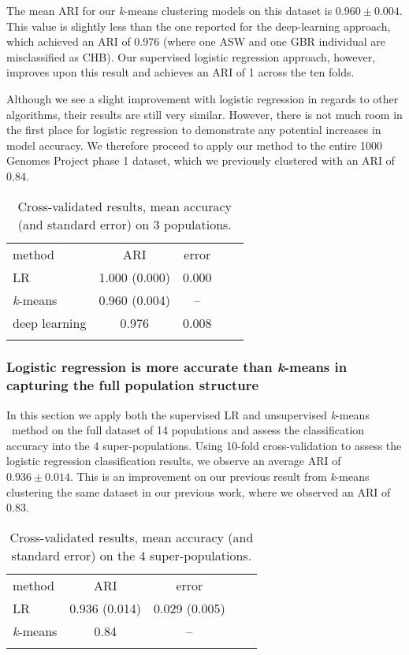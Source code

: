 \documentclass{llncs}
\newcommand{\kMeans}{\textit{k}-means }
\begin{document}
{The mean ARI for our \kMeans{} clustering models on this dataset is \(0.960 \pm 0.004 \). 
This value is slightly less than the one reported for the deep-learning approach, which achieved an ARI of 0.976 (where one ASW and one GBR individual are misclassified as CHB). 
Our supervised logistic regression approach, however, improves upon this result and achieves an ARI of 1 across the ten folds.

Although we see a slight improvement with logistic regression in regards to other algorithms, their results are still very similar.
However, there is not much room in the first place for logistic regression to demonstrate any potential increases in model accuracy.
We therefore proceed to apply our method to the entire 1000 Genomes Project phase 1 dataset, which we previously clustered with an ARI of 0.84.


\begin{table}
\caption{Cross-validated results, mean accuracy (and standard error) on 3 populations.}
\begin{center}
\renewcommand{\arraystretch}{1.4}
\setlength\tabcolsep{3pt}
\begin{tabular}{lcccc}
\hline\noalign{\smallskip}
method  & ARI & error \\
LR  & 1.000 (0.000) & 0.000 \\
\kMeans & 0.960 (0.004) & -- \\
deep learning & 0.976 & 0.008 \\
\noalign{\smallskip}
\hline
\end{tabular}
\end{center}
\end{table}


\subsubsection{Logistic regression is more accurate than \kMeans{} in capturing the full population structure}
In this section we apply both the supervised LR and unsupervised \kMeans\ method on the full dataset of 14 populations and assess the 
classification accuracy into the 4 super-populations.
Using 10-fold cross-validation to assess the logistic regression classification results, we observe an average ARI of \(0.936 \pm{} 0.014\).
This is an improvement on our previous result from \kMeans{} clustering the same dataset in our previous work, where we observed an ARI of \(0.83\).

\begin{table}
\caption{Cross-validated results, mean accuracy (and standard error) on the 4 super-populations.}
\begin{center}
\renewcommand{\arraystretch}{1.4}
\setlength\tabcolsep{3pt}
\begin{tabular}{lcccc}
\hline\noalign{\smallskip}
method  & ARI & error \\
LR  & 0.936 (0.014) & 0.029 (0.005) \\
\kMeans & 0.84 & -- \\
\noalign{\smallskip}
\hline
\end{tabular}
\end{center}
\end{table}

}
\end{document}
